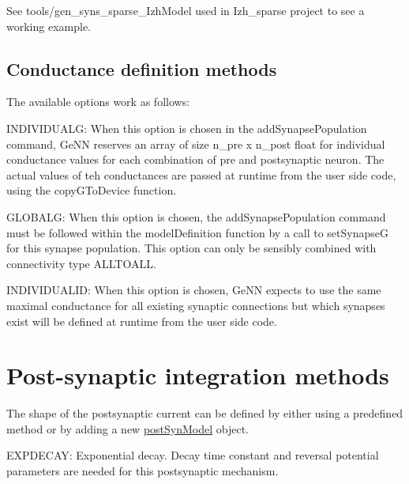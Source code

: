 See tools/gen\+\_\+syns\+\_\+sparse\+\_\+\+Izh\+Model used in Izh\+\_\+sparse project to see a working example.\hypertarget{UserManual_sec_subsect33}{}\subsection{Conductance definition methods}\label{UserManual_sec_subsect33}
The available options work as follows\+:
\begin{DoxyItemize}
\item I\+N\+D\+I\+V\+I\+D\+U\+A\+L\+G\+: When this option is chosen in the {\ttfamily add\+Synapse\+Population} command, Ge\+N\+N reserves an array of size n\+\_\+pre x n\+\_\+post float for individual conductance values for each combination of pre and postsynaptic neuron. The actual values of teh conductances are passed at runtime from the user side code, using the {\ttfamily copy\+G\+To\+Device} function.
\item G\+L\+O\+B\+A\+L\+G\+: When this option is chosen, the {\ttfamily add\+Synapse\+Population} command must be followed within the {\ttfamily model\+Definition} function by a call to {\ttfamily set\+Synapse\+G} for this synapse population. This option can only be sensibly combined with connectivity type A\+L\+L\+T\+O\+A\+L\+L.
\item I\+N\+D\+I\+V\+I\+D\+U\+A\+L\+I\+D\+: When this option is chosen, Ge\+N\+N expects to use the same maximal conductance for all existing synaptic connections but which synapses exist will be defined at runtime from the user side code. 
\end{DoxyItemize}\hypertarget{UserManual_sec_sect_postsyn}{}\section{Post-\/synaptic integration methods}\label{UserManual_sec_sect_postsyn}
The shape of the postsynaptic current can be defined by either using a predefined method or by adding a new \hyperlink{structpostSynModel}{post\+Syn\+Model} object.


\begin{DoxyItemize}
\item E\+X\+P\+D\+E\+C\+A\+Y\+: Exponential decay. Decay time constant and reversal potential parameters are needed for this postsynaptic mechanism. 
\end{DoxyItemize}